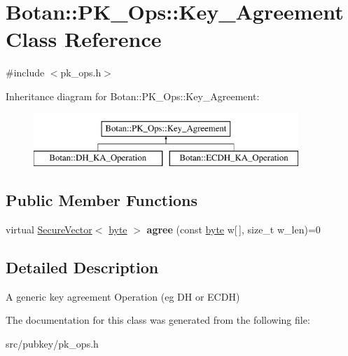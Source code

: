 \hypertarget{classBotan_1_1PK__Ops_1_1Key__Agreement}{\section{Botan\-:\-:P\-K\-\_\-\-Ops\-:\-:Key\-\_\-\-Agreement Class Reference}
\label{classBotan_1_1PK__Ops_1_1Key__Agreement}
}


{\ttfamily \#include $<$pk\-\_\-ops.\-h$>$}

Inheritance diagram for Botan\-:\-:P\-K\-\_\-\-Ops\-:\-:Key\-\_\-\-Agreement\-:\begin{figure}[H]
\begin{center}
\leavevmode
\includegraphics[height=2.000000cm]{classBotan_1_1PK__Ops_1_1Key__Agreement}
\end{center}
\end{figure}
\subsection*{Public Member Functions}
\begin{DoxyCompactItemize}
\item 
\hypertarget{classBotan_1_1PK__Ops_1_1Key__Agreement_af1e677441075e2450a0699869c24ac28}{virtual \hyperlink{classBotan_1_1SecureVector}{Secure\-Vector}$<$ \hyperlink{namespaceBotan_a7d793989d801281df48c6b19616b8b84}{byte} $>$ {\bfseries agree} (const \hyperlink{namespaceBotan_a7d793989d801281df48c6b19616b8b84}{byte} w\mbox{[}$\,$\mbox{]}, size\-\_\-t w\-\_\-len)=0}\label{classBotan_1_1PK__Ops_1_1Key__Agreement_af1e677441075e2450a0699869c24ac28}

\end{DoxyCompactItemize}


\subsection{Detailed Description}
A generic key agreement Operation (eg D\-H or E\-C\-D\-H) 

The documentation for this class was generated from the following file\-:\begin{DoxyCompactItemize}
\item 
src/pubkey/pk\-\_\-ops.\-h\end{DoxyCompactItemize}
